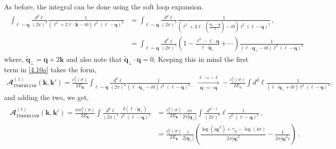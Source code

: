 As before, the integral can be done using the soft loop expansion.
\begin{align}
    \begin{split}\int_{\boldsymbol{\ell\sim\boldsymbol{q}}} \frac{d^d\boldsymbol{\ell}}{(2\pi)^3}\frac{1}{(\boldsymbol{\ell}^2+2\boldsymbol{\ell}\cdot \boldsymbol{k}-i0)\boldsymbol{\ell}^2(\boldsymbol{\ell}-\boldsymbol{q})^2}&=\int_{\boldsymbol{\ell\sim\boldsymbol{q}}} \frac{d^d\boldsymbol{\ell}}{(2\pi)^3}\frac{1}{(\boldsymbol{\ell}^2+2\boldsymbol{\ell}\cdot (\frac{\tilde{\boldsymbol{q}}_{\perp}-\boldsymbol{q}}{2})-i0)\boldsymbol{\ell}^2(\boldsymbol{\ell}-\boldsymbol{q})^2}\,,\\ &    \hspace{0cm}=\int_{\boldsymbol{\ell\sim\boldsymbol{q}}} \frac{d^d\boldsymbol{\ell}}{(2\pi)^3}\left(1-\frac{\boldsymbol{\ell}^2-\boldsymbol{\ell}\cdot \boldsymbol{q}}{\boldsymbol{\ell}\cdot\tilde{\boldsymbol{q}}_{\perp}}+\cdots\right) \frac{1}{(\boldsymbol{\ell}\cdot\boldsymbol{q_{\perp}}-i0)\boldsymbol{\ell}^2(\boldsymbol{\ell-q})^2}\label{4.10o}
    \end{split}
\end{align}
where, $\tilde{\boldsymbol{q}}_{\perp}=\boldsymbol{q}+2\boldsymbol{k}$ and also note that $\tilde{\boldsymbol{q}}_{\perp}\cdot \boldsymbol{q}=0$. Keeping this in mind the first term in \eqref{4.10o} takes the form,
\begin{align}
    \textstyle{\mathbfcal{A}^{(1)}_{\texttt{Iterative}}(\boldsymbol{k},\boldsymbol{k'})=\frac{c^2_1(\sigma)}{2E_{\boldsymbol{k}}}\int_{\boldsymbol{\ell\sim\boldsymbol{q}}} \frac{d^d\boldsymbol{\ell}}{(2\pi)^3} \frac{1}{(\boldsymbol{\ell}\cdot\tilde{\boldsymbol{q}}_{\perp}-i0)\boldsymbol{\ell}^2(\boldsymbol{\ell-q})^2}}&\xrightarrow[\boldsymbol{q}\to -\boldsymbol{q}]{\boldsymbol{\ell}\to -\boldsymbol{\ell}}-\frac{c^2_{1}(\sigma)}{2E_k}   \int d^{d}\boldsymbol{\ell}\frac{1}{(\boldsymbol{\ell}\cdot \tilde{\boldsymbol{q}}_{\perp}+i0)\boldsymbol{\ell}^2(\boldsymbol{\ell}-\boldsymbol{q})^2},
\end{align}
and adding the two, we get,
\begin{align}
   \begin{split}\mathbfcal{A}^{(1)}_{\texttt{Iterative}}(\boldsymbol{k},\boldsymbol{k'})= \frac{\pi i c_1^2(\sigma)}{2E_{\boldsymbol{k}}}\int \frac{d^d\boldsymbol{\ell}}{(2\pi)^3} \frac{\delta(\boldsymbol{\ell}\cdot\tilde{\boldsymbol{q}}_{\perp})}{\boldsymbol{\ell}^2(\boldsymbol{\ell}-\boldsymbol{q})^2}&=\frac{c_1^2(\sigma)}{2E_{\boldsymbol{k}}}\frac{i\pi}{2\pi |\tilde{\boldsymbol{q}}_{\perp}|}\int \frac{d^{d-1}}{(2\pi)^2}\boldsymbol{\ell} \frac{1}{\boldsymbol{\ell}^2(\boldsymbol{\ell}-\boldsymbol{q})^2}\,,\\ &
 =\frac{c_1^2(\sigma)}{2E_{\boldsymbol{k}}}\frac{i}{2|\boldsymbol{q}_\perp|}\left(\frac{ \log (|\boldsymbol{q}|^2)+\gamma_{E} -\log (4 \pi )}{2 \pi  |\boldsymbol{q}|^2}-\frac{1}{2 \pi |\boldsymbol{ q}|^2 \epsilon }\right)\,.
    \end{split}
\end{align}
